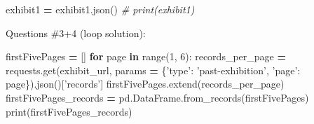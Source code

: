 \documentclass[]{book}
\newenvironment{Shaded}{\begin{snugshade}}{\end{snugshade}}
\newcommand{\BuiltInTok}[1]{#1}
\newcommand{\CommentTok}[1]{\textcolor[rgb]{0.56,0.35,0.01}{\textit{#1}}}
\newcommand{\ControlFlowTok}[1]{\textcolor[rgb]{0.13,0.29,0.53}{\textbf{#1}}}
\newcommand{\DecValTok}[1]{\textcolor[rgb]{0.00,0.00,0.81}{#1}}
\newcommand{\KeywordTok}[1]{\textcolor[rgb]{0.13,0.29,0.53}{\textbf{#1}}}
\newcommand{\NormalTok}[1]{#1}
\newcommand{\OperatorTok}[1]{\textcolor[rgb]{0.81,0.36,0.00}{\textbf{#1}}}
\newcommand{\StringTok}[1]{\textcolor[rgb]{0.31,0.60,0.02}{#1}}
\begin{document}
\begin{Shaded}
\begin{Highlighting}[]
\NormalTok{exhibit1 }\OperatorTok{=}\NormalTok{ exhibit1.json()}
\CommentTok{# print(exhibit1)}
\end{Highlighting}
\end{Shaded}

Questions \#3+4 (loop solution):

\begin{Shaded}
\begin{Highlighting}[]
\NormalTok{firstFivePages }\OperatorTok{=}\NormalTok{ []}
\ControlFlowTok{for}\NormalTok{ page }\KeywordTok{in} \BuiltInTok{range}\NormalTok{(}\DecValTok{1}\NormalTok{, }\DecValTok{6}\NormalTok{):}
\NormalTok{    records_per_page }\OperatorTok{=}\NormalTok{ requests.get(exhibit_url, params }\OperatorTok{=}\NormalTok{ \{}\StringTok{'type'}\NormalTok{: }\StringTok{'past-exhibition'}\NormalTok{, }\StringTok{'page'}\NormalTok{: page\}).json()[}\StringTok{'records'}\NormalTok{]}
\NormalTok{    firstFivePages.extend(records_per_page)}
\NormalTok{firstFivePages_records }\OperatorTok{=}\NormalTok{ pd.DataFrame.from_records(firstFivePages)}
\BuiltInTok{print}\NormalTok{(firstFivePages_records)}
\end{Highlighting}
\end{Shaded}
\end{document}

